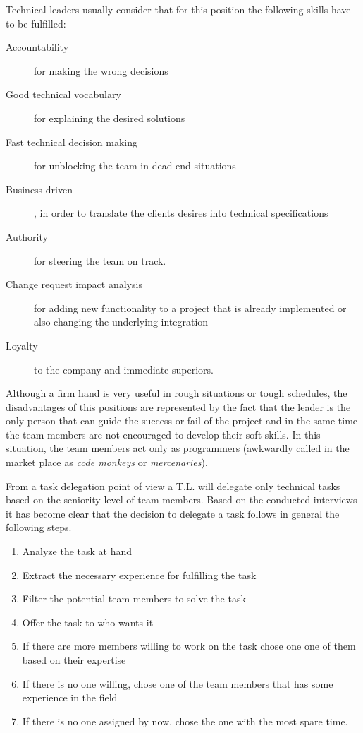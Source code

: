 Technical leaders usually consider that for this position the following skills have to be fulfilled:
\begin{description}
\item [Accountability] for making the wrong decisions
\item [Good technical vocabulary] for explaining the desired solutions
\item [Fast technical decision making] for unblocking the team in dead end situations
\item [Business driven], in order to translate the clients desires into technical specifications
\item [Authority] for steering the team on track.
\item [Change request impact analysis] for adding new functionality  to a project that is already implemented or also changing the underlying integration
\item [Loyalty] to the company and immediate superiors.
\end{description}

Although a firm hand is very useful in rough situations or tough schedules, the disadvantages of this positions are represented by the fact that the leader is the only person that can guide the success or fail of the project and in the same time the team members are not encouraged to develop their soft skills. In this situation, the team members act only as programmers (awkwardly called in the market place as \textit{code monkeys} or \textit{mercenaries}).

From a task delegation point of view a T.L. will delegate only technical tasks based on the seniority level of team members. Based on the conducted interviews it has become clear that the decision to delegate a task follows in general the following steps.
\begin{enumerate}
\item Analyze the task at hand
\item Extract the necessary experience for fulfilling the task
\item Filter the potential team members to solve the task
\item Offer the task to who wants it
\item If there are more members willing to work on the task chose one one of them based on their expertise
\item If there is no one willing, chose one of the team members that has some experience in the field
\item If there is no one assigned by now, chose the one with the most spare time.
\end{enumerate}

